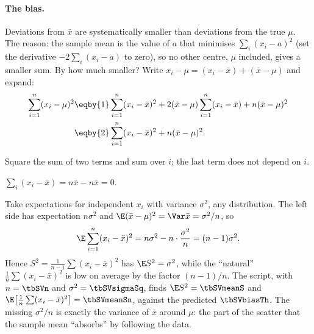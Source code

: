 \paragraph{The bias.} Deviations from $\bar x$ are systematically smaller than deviations from the true $\mu$. The reason: the sample mean is the value of $a$ that minimises $\sum_i(x_i-a)^2$ (set the derivative $-2\sum_i(x_i-a)$ to zero), so no other centre, $\mu$ included, gives a smaller sum. By how much smaller? Write $x_i-\mu=(x_i-\bar x)+(\bar x-\mu)$ and expand:
\begin{align}
  \sum_{i=1}^n(x_i-\mu)^2
  &\eqby{1} \sum_{i=1}^n(x_i-\bar x)^2+2(\bar x-\mu)\sum_{i=1}^n(x_i-\bar x)+n(\bar x-\mu)^2 \nonumber\\
  &\eqby{2} \sum_{i=1}^n(x_i-\bar x)^2+n(\bar x-\mu)^2 .
  \label{2b:eq:ss-split}
\end{align}
\begin{explain}
  \item Square the sum of two terms and sum over $i$; the last term does not depend on $i$.
  \item $\sum_i(x_i-\bar x)=n\bar x-n\bar x=0$.
\end{explain}
Take expectations for independent $x_i$ with variance $\sigma^2$, any distribution. The left side has expectation $n\sigma^2$ and $\E(\bar x-\mu)^2=\Var\bar x=\sigma^2/n$, so
\begin{equation}
  \E\sum_{i=1}^n(x_i-\bar x)^2=n\sigma^2-n\cdot\frac{\sigma^2}{n}=(n-1)\sigma^2 .
  \label{2b:eq:nminus1}
\end{equation}
Hence $S^2=\frac1{n-1}\sum(x_i-\bar x)^2$ has $\E S^2=\sigma^2$, while the ``natural'' $\frac1n\sum(x_i-\bar x)^2$ is low on average by the factor $(n-1)/n$. The script, with $n=\tbSVn$ and $\sigma^2=\tbSVsigmaSq$, finds $\E S^2=\tbSVmeanS$ and $\E\bigl[\frac1n\sum(x_i-\bar x)^2\bigr]=\tbSVmeanSn$, against the predicted $\tbSVbiasTh$. The missing $\sigma^2/n$ is exactly the variance of $\bar x$ around $\mu$: the part of the scatter that the sample mean ``absorbs'' by following the data.

